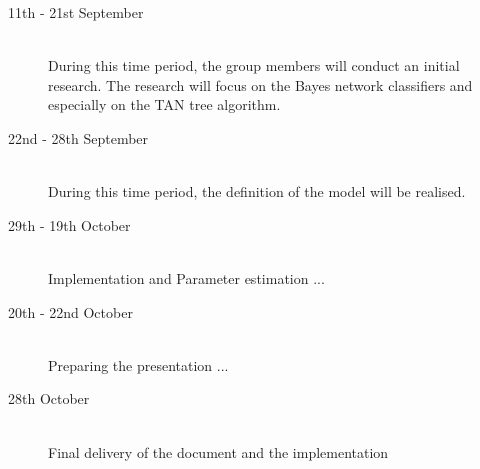\documentclass[a4paper, 11pt]{scrartcl}
\begin{document}
\begin{description}
	\item[11th - 21st September]\-\\
	During this time period, the group members will conduct an initial research. The research will focus on the Bayes network classifiers and especially on the TAN tree algorithm.
	\item[22nd - 28th September]\-\\
	During this time period, the definition of the model will be realised. \cite{CV:2009kl}
	\item[29th - 19th October]\-\\
	Implementation and Parameter estimation ...
	\item[20th - 22nd October]\-\\
	Preparing the presentation ...
	\item[28th October]\-\\
	Final delivery of the document and the implementation
\end{description}

%

%
\end{document}
